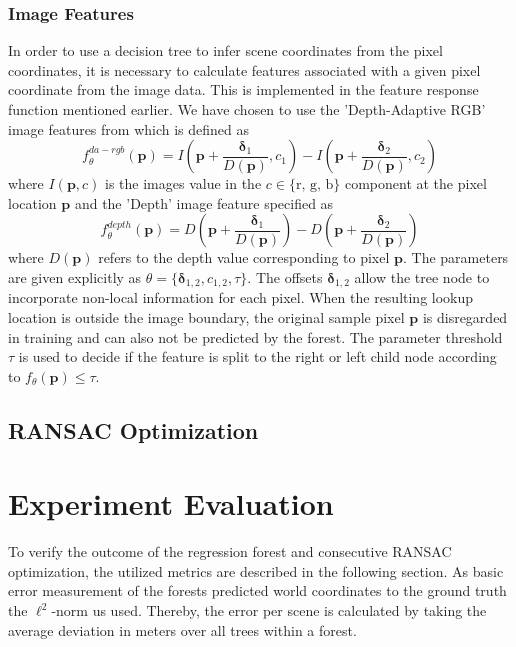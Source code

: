 \documentclass[final]{cvpr}
\begin{document}
\subsubsection{Image Features}
In order to use a decision tree to infer scene coordinates from the pixel coordinates,
it is necessary to calculate features associated with a given pixel coordinate from the
image data. This is implemented in the feature response function mentioned earlier.
We have chosen to use the 'Depth-Adaptive RGB' image features from \cite{shotton2013} which
is defined as
\begin{equation}
	f_{\theta}^{da-rgb}(\boldsymbol{p}) = I\left(\boldsymbol{p} + \frac{\boldsymbol{\delta}_1}{D(\boldsymbol{p})}, c_1\right)
	- I\left(\boldsymbol{p} + \frac{\boldsymbol{\delta}_2}{D(\boldsymbol{p})}, c_2\right)
\end{equation}
where $I(\boldsymbol{p}, c)$ is the images value in the $c \in \{\text{r, g, b}\}$ component at
the pixel location $\boldsymbol{p}$ and the 'Depth' image feature specified as
\begin{equation}
	f_{\theta}^{depth}(\boldsymbol{p}) = D\left(\boldsymbol{p} + \frac{\boldsymbol{\delta}_1}{D(\boldsymbol{p})}\right)
	- D\left(\boldsymbol{p} + \frac{\boldsymbol{\delta}_2}{D(\boldsymbol{p})}\right)
\end{equation}
where $D(\boldsymbol{p})$ refers to the depth value corresponding to pixel $\boldsymbol{p}$.
The parameters are given explicitly as $\theta = \{\boldsymbol{\delta}_{1,2}, c_{1,2}, \tau\}$. 
The offsets $\boldsymbol{\delta}_{1,2}$
allow the tree node to incorporate non-local information for each pixel. When the resulting
lookup location is outside the image boundary, the original sample pixel $\boldsymbol{p}$ is
disregarded in training and can also not be predicted by the forest. The parameter threshold 
$\tau$ is used to decide if the feature is split to the right or left child node according to 
$f_{\theta}(\boldsymbol{p}) \leq \tau$.


\subsection{RANSAC Optimization}

\section{Experiment Evaluation} \label{sec:eval}
To verify the outcome of the regression forest and consecutive RANSAC optimization, the utilized metrics are described
in the following section. As basic error measurement of the forests predicted world coordinates to the ground truth the 
$\ell^2$-norm us used. Thereby, the error per scene is calculated by taking the average deviation in meters 
over all trees within a forest. 
\end{document}
